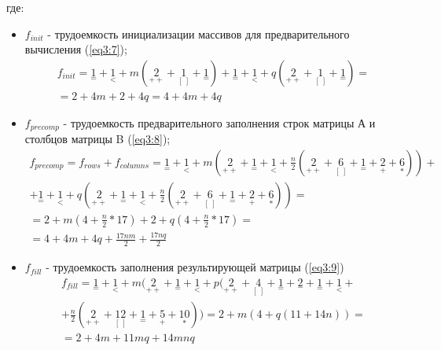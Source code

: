 где:
\begin{itemize}
	\item $f_{init}$ - трудоемкость инициализации массивов для предварительного вычисления (\ref{eq3:7});
	\begin{multline}
		\label{eq3:7}
		f_{init} = {\underset{=}{1}} + {\underset{<}{1}} + m({\underset{++}{2}} + {\underset{[\ ]}{1}} + {\underset{=}{1}}) + {\underset{=}{1}} + {\underset{<}{1}} + q({\underset{++}{2}} + {\underset{[\ ]}{1}} + {\underset{=}{1}}) = \\
		= 2 + 4m + 2 + 4q = 4 + 4m + 4q 
	\end{multline}


	\item $f_{precomp}$ - трудоемкость предварительного заполнения строк матрицы А и столбцов матрицы B (\ref{eq3:8});
	\begin{multline}
		\label{eq3:8}
		f_{precomp} = f_{rows} + f_{columns} = {\underset{=}{1}} + {\underset{<}{1}} + m({\underset{++}{2}} + {\underset{=}{1}} + {\underset{<}{1}} + \frac{n}{2}({\underset{++}{2}} + {\underset{[\ ]}{6}} + {\underset{=}{1}} + {\underset{+}{2}} + {\underset{*}{6}})) + \\
		+ {\underset{=}{1}} + {\underset{<}{1}} + q({\underset{++}{2}} + {\underset{=}{1}} + {\underset{<}{1}} + \frac{n}{2}({\underset{++}{2}} + {\underset{[\ ]}{6}} + {\underset{=}{1}} + {\underset{+}{2}} + {\underset{*}{6}})) = \\
		= 2 + m(4 + \frac{n}{2} * 17) + 2 + q(4 + \frac{n}{2} * 17) = \\
		= 4 + 4m + 4q + \frac{17nm}{2} + \frac{17nq}{2}
	\end{multline}


	\item $f_{fill}$ - трудоемкость заполнения результирующей матрицы (\ref{eq3:9})
	\begin{multline}
		\label{eq3:9}
		f_{fill} = {\underset{=}{1}} + {\underset{<}{1}} + m({\underset{++}{2}} + {\underset{=}{1}} + {\underset{<}{1}} + p({\underset{++}{2}} + {\underset{[\ ]}{4}} + {\underset{=}{1}} + {\underset{-}{2}} + {\underset{=}{1}} + {\underset{<}{1}} +\\
		+ \frac{n}{2}({\underset{++}{2}} + {\underset{[\ ]}{12}} + {\underset{=}{1}} +
		{\underset{+}{5}} + {\underset{*}{10}})) = 2 + m(4 + q(11 + 14n)) = \\
		= 2 + 4m + 11mq + 14mnq
	\end{multline}


\end{itemize}
